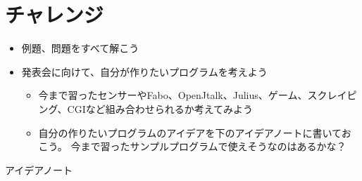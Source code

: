 
\clearpage
{}\label{P:challenge}
\section{チャレンジ}
\begin{itemize}
\item 例題、問題をすべて解こう
\item
発表会に向けて、自分が作りたいプログラムを考えよう

\begin{itemize}
\item
今まで習ったセンサーやFabo、OpenJtalk、Julius、ゲーム、スクレイピング、CGIなど組み合わせられるか考えてみよう
\item
自分の作りたいプログラムのアイデアを下のアイデアノートに書いておこう。
		今まで習ったサンプルプログラムで使えそうなのはあるかな？
\end{itemize}
\end{itemize}
アイデアノート

% 	　　　　　　　　　　　　　　　　　　　　　　　　　

